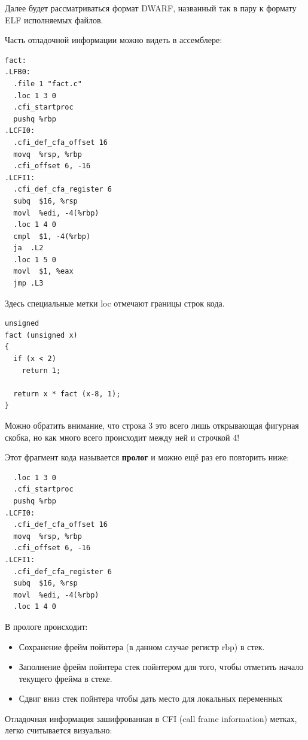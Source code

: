 \documentclass[a4paper,12pt,oneside]{article}
\begin{document}
Далее будет рассматриваться формат DWARF, названный так в пару к формату ELF исполняемых файлов.

Часть отладочной информации можно видеть в ассемблере:

\begin{verbatim}
fact:
.LFB0:
  .file 1 "fact.c"
  .loc 1 3 0
  .cfi_startproc
  pushq %rbp
.LCFI0:
  .cfi_def_cfa_offset 16
  movq  %rsp, %rbp
  .cfi_offset 6, -16
.LCFI1:
  .cfi_def_cfa_register 6
  subq  $16, %rsp
  movl  %edi, -4(%rbp)
  .loc 1 4 0
  cmpl  $1, -4(%rbp)
  ja  .L2
  .loc 1 5 0
  movl  $1, %eax
  jmp .L3
\end{verbatim}

Здесь специальные метки loc отмечают границы строк кода. 

\begin{lstlisting}
unsigned
fact (unsigned x)
{
  if (x < 2)
    return 1;

  return x * fact (x-8, 1);
}
\end{lstlisting}

Можно обратить внимание, что строка 3 это всего лишь открывающая фигурная скобка, но как много всего происходит между ней и строчкой 4!

Этот фрагмент кода называется \textbf{пролог} и можно ещё раз его повторить ниже:

\begin{verbatim}
  .loc 1 3 0
  .cfi_startproc
  pushq %rbp
.LCFI0:
  .cfi_def_cfa_offset 16
  movq  %rsp, %rbp
  .cfi_offset 6, -16
.LCFI1:
  .cfi_def_cfa_register 6
  subq  $16, %rsp
  movl  %edi, -4(%rbp)
  .loc 1 4 0
\end{verbatim}

В прологе происходит:

\begin{itemize}
\item Сохранение фрейм пойнтера (в данном случае регистр rbp) в стек.

\item Заполнение фрейм пойнтера стек пойнтером для того, чтобы отметить начало текущего фрейма в стеке.

\item Сдвиг вниз стек пойнтера чтобы дать место для локальных переменных
\end{itemize}

Отладочная информация зашифрованная в CFI (call frame information) метках, легко считывается визуально:
\end{document}

